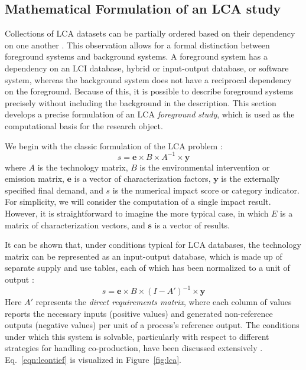 \subsection{Mathematical Formulation of an LCA study}

Collections of LCA datasets can be partially ordered based on their dependency on one another \citep{Kuczenski_JLCA_2015}.  This observation allows for a formal distinction between foreground systems and background systems. A foreground system has a dependency on an LCI database, hybrid or input-output database, or software system, whereas the background system does not have a reciprocal dependency on the foreground.  Because of this, it is possible to describe foreground systems precisely %
without including the background in the description.  This section develops a precise formulation of an LCA \emph{foreground study}, which is used as the computational basis for the research object.


We begin with the classic formulation of the LCA problem \citep{Heijungs2002}:
\begin{equation}
s = \mathbf{e} \times B \times A^{-1} \times \mathbf{y}
\end{equation}
where $A$ is the technology matrix, $B$ is the environmental intervention or emission matrix, $\mathbf{e}$ is a vector of characterization factors, $\mathbf{y}$ is the externally specified final demand, and $s$ is the numerical impact score or category indicator.   For simplicity, we will consider the computation of a single impact result.  However, it is straightforward to imagine the more typical case, in which $E$ is a matrix of characterization vectors, and $\mathbf{s}$ is a vector of results.

It can be shown that, under conditions typical for LCA databases, the technology matrix can be represented as an input-output database, which is made up of separate supply and use tables, each of which has been normalized to a unit of output \citep{Suh_JIE_2010, Pauliuk_2015_framework}:
\begin{equation}
s = \mathbf{e} \times B \times \left(I - A'\right)^{-1} \times \mathbf{y}
\label{eqn:leontief}
\end{equation}
Here $A'$ represents the \emph{direct requirements matrix}, where each column of values reports the necessary inputs (positive values) and generated non-reference outputs (negative values) per unit of a process's reference output.  The conditions under which this system is solvable, particularly with respect to different strategies for handling co-production, have been discussed extensively \citep{Majeau_Bettez_2014}.  Eq.~\ref{eqn:leontief} is visualized in Figure~\ref{fig:lca}. 


